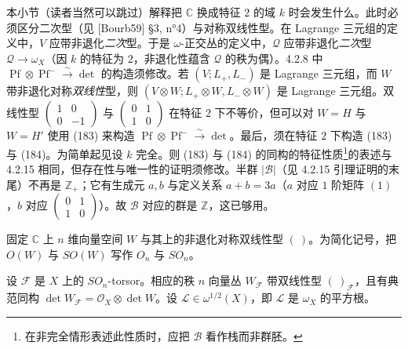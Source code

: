  本小节（读者当然可以跳过）解释把 $\mathbb{C}$ 换成特征 $2$ 的域 $k$ 时会发生什么。此时必须区分二次型（见 [Bourb59] §3, n°4）与对称双线性型。在 Lagrange 三元组的定义中，$V$ 应带非退化\emph{二次}型。于是 $\omega$-正交丛的定义中，$\mathcal{Q}$ 应带非退化\emph{二次}型 $\mathcal{Q}\to\omega_{X}$（因 $k$ 的特征为 $2$，非退化性蕴含 $\mathcal{Q}$ 的秩为偶）。4.2.8 中 $\operatorname{Pf}\otimes\operatorname{Pf}^{-}\xrightarrow{\ \sim\ }\det$ 的构造须修改。若 $(V;L_{+},L_{-})$ 是 Lagrange 三元组，而 $W$ 带非退化对称\emph{双线性}型，则 $(V\otimes W;L_{+}\otimes W,L_{-}\otimes W)$ 是 Lagrange 三元组。双线性型 $\left(\begin{smallmatrix}1&0\\0&-1\end{smallmatrix}\right)$ 与 $\left(\begin{smallmatrix}0&1\\1&0\end{smallmatrix}\right)$ 在特征 $2$ 下不等价，但可以对 $W=H$ 与 $W=H'$ 使用 (183) 来构造 $\operatorname{Pf}\otimes\operatorname{Pf}^{-}\xrightarrow{\ \sim\ }\det$。最后，须在特征 $2$ 下构造 (183) 与 (184)。为简单起见设 $k$ 完全。则 (183) 与 (184) 的同构的特征性质\footnote{在非完全情形表述此性质时，应把 $\mathcal{B}$ 看作栈而非群胚。}的表述与 4.2.15 相同，但存在性与唯一性的证明须修改。半群 $|\mathcal{B}|$（见 4.2.15 引理证明的末尾）不再是 $\mathbb{Z}_{+}$；它有生成元 $a,b$ 与定义关系 $a+b=3a$（$a$ 对应 $1$ 阶矩阵 $(1)$，$b$ 对应 $\left(\begin{smallmatrix}0&1\\1&0\end{smallmatrix}\right)$）。故 $\mathcal{B}$ 对应的群是 $\mathbb{Z}$，这已够用。


 固定 $\mathbb{C}$ 上 $n$ 维向量空间 $W$ 与其上的非退化对称双线性型 $(\ )$。为简化记号，把 $O(W)$ 与 $SO(W)$ 写作 $O_{n}$ 与 $SO_{n}$。

设 $\mathcal{F}$ 是 $X$ 上的 $SO_{n}$-torsor。相应的秩 $n$ 向量丛 $W_{\mathcal{F}}$ 带双线性型 $(\ )_{\mathcal{F}}$，且有典范同构 $\det W_{\mathcal{F}}=\mathcal{O}_{X}\otimes\det W$。设 $\mathcal{L}\in\omega^{1/2}(X)$，即 $\mathcal{L}$ 是 $\omega_{X}$ 的平方根。

